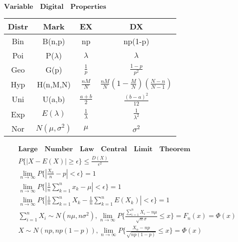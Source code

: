 \documentclass{article}
\begin{document}
$\bm{Variable \quad Digital \quad Properties}$ \\ 
\begin{tabular}{|c|c|c|c|}%
    \hline 
    Distr & Mark & EX & DX \\ 
    \hline 
    Bin & B(n,p) & np & np(1-p) \\ 
    \hline 
    Poi & P($\lambda$) & $\lambda$ & $\lambda$ \\ 
    \hline 
    Geo & G(p) & $\frac{1}{p}$ & $\frac{1-p}{p^2}$ \\ 
    \hline 
    Hyp & H(n,M,N) & $\frac{nM}{N}$ & $\frac{nM}{N}(1-\frac{M}{N})(\frac{N-n}{N-1})$ \\ 
    \hline 
    Uni & U(a,b) & $\frac{a+b}{2}$ & $\frac{(b-a)^2}{12}$ \\ 
    \hline 
    Exp & $E(\lambda)$ & $\frac{1}{\lambda}$ & $\frac{1}{\lambda^2}$ \\ 
    \hline 
    Nor & $N(\mu,\sigma^2)$ & $\mu$ & $\sigma^2$ \\ 
    \hline 
\end{tabular}

\begin{align*}
    \bm{Large \quad Number \quad Law \quad Central \quad Limit \quad Theorem } \\ 
    P \{ {|X-E(X)|\ge \epsilon} \} \le \frac{D(X)}{\epsilon^{2}} \\
    \lim_{n \to \infty}P\{|\frac{X_{n}}{n}-p| < \epsilon\} = 1 \\
    \lim_{n \to \infty}P\{|\frac{1}{n}\sum_{k=1}^nx_{k}-\mu|<\epsilon\} = 1 \\
    \lim_{n \to \infty}P\{|\frac{1}{n}\sum_{k=1}^n X_{k} - \frac{1}{n}\sum_{k=1}^n E(X_{k})| < \epsilon\} = 1 \\ 
    \sum_{i=1}^{n}X_{i} \sim N(n\mu,n\sigma^2), \lim_{n \to \infty}P\{\frac{\sum_{i=1}^nX_{i}-n\mu}{\sqrt{n}\sigma} \le x\} = F_{n}(x) = \Phi(x) \\ 
    X \sim N(np,np(1-p)), \lim_{n \to \infty }P\{\frac{X_{n}-np}{\sqrt{np(1-p)}} \le x \} = \Phi(x) \\ 
\end{align*}
\end{document}
